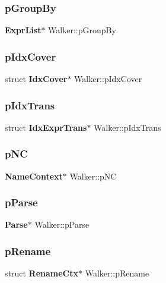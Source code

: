\mbox{\label{struct_walker_afa30acf714235acde42049207dbad838}} 
\subsubsection{pGroupBy}
{\footnotesize\ttfamily \textbf{ Expr\+List}$\ast$ Walker\+::p\+Group\+By}

\mbox{\label{struct_walker_af183095ecc6ae7ee8bd00babd915901c}} 
\subsubsection{pIdxCover}
{\footnotesize\ttfamily struct \textbf{ Idx\+Cover}$\ast$ Walker\+::p\+Idx\+Cover}

\mbox{\label{struct_walker_a2519590d1d6c3f23308c9112570e51c4}} 
\subsubsection{pIdxTrans}
{\footnotesize\ttfamily struct \textbf{ Idx\+Expr\+Trans}$\ast$ Walker\+::p\+Idx\+Trans}

\mbox{\label{struct_walker_adbf5872a6c5a9311adbfe01c0e444388}} 
\subsubsection{pNC}
{\footnotesize\ttfamily \textbf{ Name\+Context}$\ast$ Walker\+::p\+NC}

\mbox{\label{struct_walker_ac6e8e756b5da8f187b9cf6b94560f352}} 
\subsubsection{pParse}
{\footnotesize\ttfamily \textbf{ Parse}$\ast$ Walker\+::p\+Parse}

\mbox{\label{struct_walker_a48077f45d72681843d23b44a04488b4d}} 
\subsubsection{pRename}
{\footnotesize\ttfamily struct \textbf{ Rename\+Ctx}$\ast$ Walker\+::p\+Rename}

